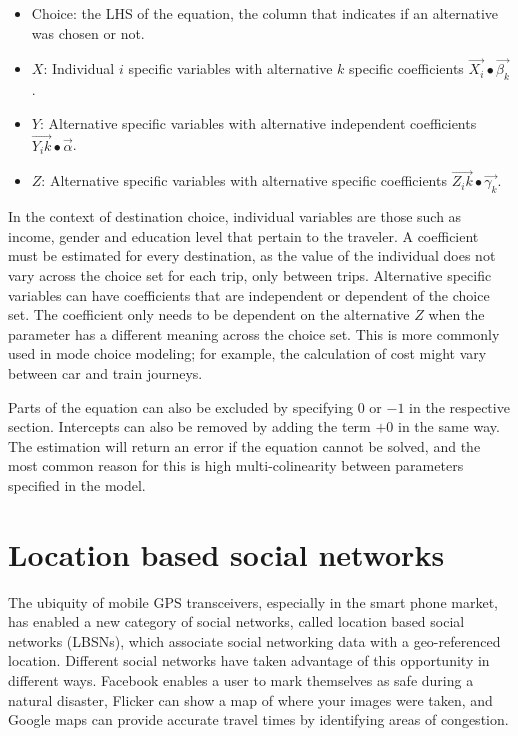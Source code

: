 \begin{itemize}
	\item Choice: the LHS of the equation, the column that indicates if an alternative was chosen or not.
	\item $X$: Individual $i$ specific variables with alternative $k$ specific coefficients $\vec{X_i} ∙\vec{\beta_k}$.

	\item $Y$: Alternative specific variables with alternative independent coefficients $\vec{Y_ik} ∙\vec{\alpha}$. 
	\item $Z$: Alternative specific variables with alternative specific coefficients
$\vec{Z_ik} ∙\vec{\gamma_k}$.
\end{itemize}

In the context of destination choice, individual variables are those such as income, gender and education level that pertain to the traveler. A coefficient must be estimated for every destination, as the value of the individual does not vary across the choice set for each trip, only between trips. Alternative specific variables can have coefficients that are independent or dependent of the choice set. The coefficient only needs to be dependent on the alternative $Z$ when the parameter has a different meaning across the choice set. This is more commonly used in mode choice modeling; for example, the calculation of cost might vary between car and train journeys.

Parts of the equation can also be excluded by specifying $0$ or $-1$ in the respective section. Intercepts can also be removed by adding the term $+ 0$ in the same way. The estimation will return an error if the equation cannot be solved, and the most common reason for this is high multi-colinearity between parameters specified in the model.

\section{Location based social networks}
The ubiquity of mobile GPS transceivers, especially in the smart phone market, has enabled a new category of social networks, called location based social networks (LBSNs), which associate social networking data with a geo-referenced location. Different social networks have taken advantage of this opportunity in different ways. Facebook enables a user to mark themselves as safe during a natural disaster, Flicker can show a map of where your images were taken, and Google maps can provide accurate travel times by identifying areas of congestion. 

